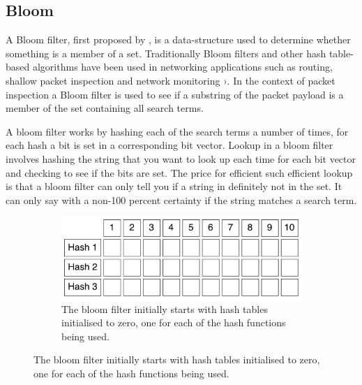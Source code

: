 \documentclass{article}
\begin{document}
\subsection{Bloom}

A Bloom filter, first proposed by \cite{Bloom1970}, is a data-structure used to determine whether something is a member of a set. Traditionally Bloom filters and other hash table-based algorithms have been used in networking applications such as routing, shallow packet inspection and network monitoring \citep{Song2005}›. In the context of packet inspection a Bloom filter is used to see if a substring of the packet payload is a member of the set containing all search terms.

A bloom filter works by hashing each of the search terms a number of times, for each hash a bit is set in a corresponding bit vector. Lookup in a bloom filter involves hashing the string that you want to look up each time for each bit vector and checking to see if the bits are set. The price for efficient such efficient lookup is that a bloom filter can only tell you if a string in definitely not in the set. It can only say with a non-100 percent certainty if the string matches a search term.

\begin{figure}[h!bt]
  \label{bloom-1}
  \centering
  
  \begin{subfigure}{\textwidth}
  \makeatletter
  \includegraphics[width=\textwidth]{images/bloom-1}
  \caption{The bloom filter initially starts with hash tables initialised to zero, one for each of the hash functions being used.}
  \end{subfigure}
\end{figure} 
\end{document}

